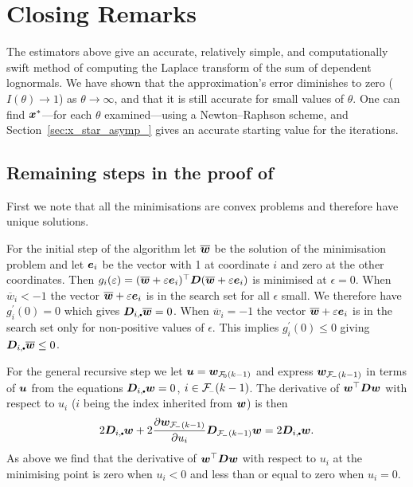 \section{Closing Remarks}\label{S:Remarks}

The estimators above give an accurate, relatively simple, and computationally
swift method of computing the Laplace transform of the sum of dependent
lognormals. We have shown that the approximation's error diminishes to zero
($I(\theta) \to 1$) as $\theta \to \infty$, and that it is still accurate for
small values of $\theta$. One can find $\bm{x}^*$---for each $\theta$
examined---using a Newton--Raphson scheme, and Section~\ref{sec:x_star_asymp_}
gives an accurate starting value for the iterations.

\begin{subappendices}

\section{Remaining steps in the proof of }

First we note that all the minimisations are convex problems and therefore
have unique solutions.

For the initial step of the algorithm let $\overline {\bm{w}}$ be the solution of
the minimisation problem and let $\bm{e}_i$ be the vector with 1 at coordinate
$i$ and zero at the other coordinates. Then $g_i(\varepsilon)=(\overline
{\bm{w}}+\varepsilon \bm{e}_i)^\top\bm{D}(\overline {\bm{w}}+\varepsilon \bm{e}_i)$ is minimised at
$\epsilon=0$. When $\overline w_i<-1$ the vector $\overline {\bm{w}}+\varepsilon
\bm{e}_i$ is in the search set for all $\epsilon$ small. We therefore have
$g_i^\prime(0)=0$ which gives $\bfD_{i,\sbullet}\overline \bfw=0$.  When
$\overline w_i=-1$ the vector $\overline {\bm{w}}+\varepsilon \bm{e}_i$ is in the
search set only for non-positive values of $\epsilon$.  This implies
$g_i^\prime(0)\leq 0$ giving $\bfD_{i,\sbullet}\overline \bfw\leq 0$.

For the general recursive step we let $\bfu=\bfw_{\Fset{0}(k-1)}$ and express
$\bfw_{\Fset{-}(k-1)}$ in terms of $\bm{u}$ from the equations
$\bfD_{i,\sbullet}\bfw=0$, $i\in \Fset{-}(k-1)$. The derivative of $\bm{w}^\top
\bm{D} \bm{w}$ with respect to $u_i$ ($i$ being the index inherited from $\bm{w}$)
is then
$$2\bfD_{i,\sbullet}\bfw+2\frac{\partial \bfw_{\Fset{-}(k-1)}}{\partial
u_i}\bfD_{\Fset{-}(k-1)}\bfw= 2\bfD_{i,\sbullet}\bfw.$$
As above we find that the derivative of $\bm{w}^\top \bm{D} \bm{w}$ with respect to
$u_i$ at the minimising point is zero when $u_i<0$ and less than or equal to
zero when $u_i=0$.


\end{subappendices}
